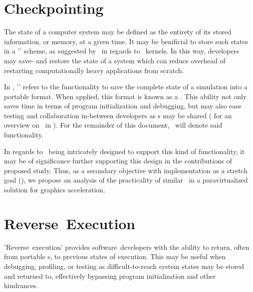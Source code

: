 \section{Checkpointing}
\label{sec:researchquestions_checkpointing}
The state of a computer system may be defined as the entirety of its stored information, or memory, at a given time.
It may be benificial to store such states in a '\termcheckpointrestart ' scheme, as suggested by \ in regards to \termcuda\ kernels. 
In this way, developers may save- and restore the state of a system which can reduce overhead of restarting computationally heavy applications from scratch.

In \termsimics , '\termcheckpointing ' refers to the functionality to save the complete state of a simulation into a portable format.
When applied, this format is known as a \termcheckpoint .
This ability not only  saves time in terms of program initialization and debugging, but may also ease testing and collaboration in-between developers as \termcheckpoint s may be shared ( for an overview on \termcheckpointing\ in \termsimics ).
For the remainder of this document, \termcheckpointing\ will denote said functionality.

In regards to \termsimics\ being intricately designed to support this kind of functionality, it may be of significance further supporting this design in the contributions of proposed study.
Thus, as a secondary objective with implementation as a stretch goal (), we propose an analysis of the practicality of similar \termcheckpointing\ in a paravirtualized solution for graphics acceleration.

\section{Reverse~Execution}
\label{sec:researchquestions_reverseexecution}
'Reverse~execution' provides software~developers with the ability to return, often from portable \termcheckpoint s, to previous states of execution.
This may be useful when debugging, profiling, or testing as difficult-to-reach system states may be stored and returned to, effectively bypassing program initialization and other hindrances.

